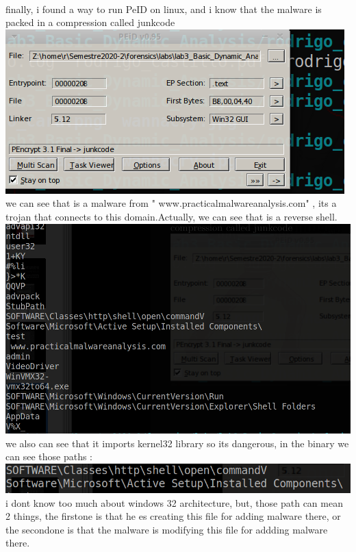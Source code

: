 \documentclass[10pt,a4paper]{article} %
\begin{document}
        \\
        finally, i found a way to run PeID on linux, and i know that the
        malware is packed in a compression called junkcode
        \\\includegraphics[width=0.8\linewidth]{packed.png}
        \\
        we can see that is a malware from " www.practicalmalwareanalysis.com" ,
        its a trojan that connects to this domain.Actually, we can see that is
        a reverse shell.\\
        \includegraphics[width=0.8\linewidth]{strings.png}
        \\
        we also can see that it imports kernel32 library so its dangerous, in the binary we can see those paths :
        \\ \includegraphics[width=0.5\linewidth]{newfiles.png}
        \\ i dont know too much about windows 32 architecture, but, those path
        can mean 2 things, the firstone is that he es creating this file for
        adding malware there, or the secondone is that the malware is modifying
        this file for addding malware there.
\end{document}
